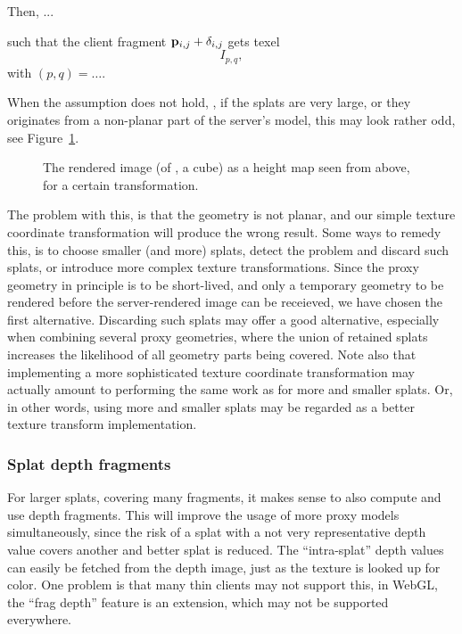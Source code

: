 Then, ...

such that the client fragment $\mathbf{p}_{i, j} + \delta_{i, j}$ gets texel
\[
  I_{p, q},
\]
with $(p, q) = \ldots$.

When the assumption does not hold, \eg, if the splats are very large, or they
originates from a non-planar part of the server's model, this may look rather
odd, see Figure~\ref{fig:LargeSplatsOnCorners}.

\begin{figure}[htb]
  \centering
  \caption{\label{fig:LargeSplatsOnCorners}
           The rendered image (of \eg, a cube) as a height map seen from above,
           for a certain transformation.}
\end{figure}

The problem with this, is that the geometry is not planar, and our simple texture
coordinate transformation will produce the wrong result. Some ways to remedy
this, is to choose smaller (and more) splats, detect the problem and discard
such splats, or introduce more complex texture transformations. Since the proxy
geometry in principle is to be short-lived, and only a temporary geometry to be
rendered before the server-rendered image can be receieved, we have chosen the
first alternative. Discarding such splats may offer a good alternative,
especially when combining several proxy geometries, where the union of retained
splats increases the likelihood of all geometry parts being covered. Note also
that implementing a more sophisticated texture coordinate transformation may
actually amount to performing the same work as for more and smaller splats. Or,
in other words, using more and smaller splats may be regarded as a better
texture transform implementation.


\subsubsection{Splat depth fragments}

For larger splats, covering many fragments, it makes sense to also compute and
use depth fragments. This will improve the usage of more proxy models
simultaneously, since the risk of a splat with a not very representative depth
value covers another and better splat is reduced. The ``intra-splat'' depth
values can easily be fetched from the depth image, just as the texture is looked
up for color. One problem is that many thin clients may not support this, in
WebGL, the ``frag depth'' feature is an extension, which may not be supported
everywhere.


